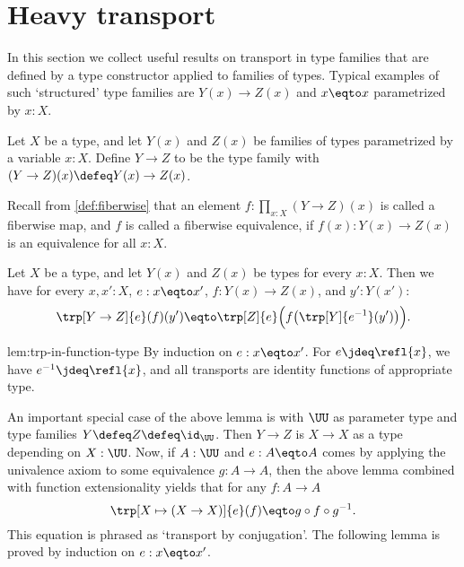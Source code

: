 \section{Heavy transport}
\label{sec:heavy-transport}

In this section we collect useful results on transport in
type families that are defined by a type constructor applied
to families of types.
Typical examples of such `structured' type families are
$Y(x)\to Z(x)$ and $x \eqto x$ parametrized by $x:X$.

\begin{definition}\label{def:function-type-families}
Let $X$ be a type, and let $Y(x)$ and $Z(x)$ be families of types parametrized by a variable $x:X$.
Define $Y\to Z$ to be the type family
with $(Y\to Z)(x) \defeq Y(x)\to Z(x)$.
\end{definition}
Recall from \cref{def:fiberwise} that an element $f : \prod_{x:X}(Y\to Z)(x)$
is called a fiberwise map,
and $f$ is called a fiberwise equivalence,
if $f(x): Y(x)\to Z(x)$ is an equivalence for all $x:X$.

\begin{construction}\label{lem:trp-in-function-type}
Let $X$ be a type, and let $Y(x)$ and $Z(x)$ be types for every $x:X$.
Then we have for every $x,x':X$, $e: x \eqto x'$, $f: Y(x)\to Z(x)$, and $y':Y(x')$:
\[
\trp[Y\to Z]{ e} (f)(y') \eqto \trp[Z]{e} \Bigl(f\bigl(\trp[Y]{ e^{-1}}(y')\bigr)\Bigr).
\]
\end{construction}
\begin{implementation}{lem:trp-in-function-type}
By induction on $e: x \eqto x'$. For $e \jdeq \refl{x}$, we have $e^{-1}\jdeq \refl{x}$,
and all transports are identity functions of appropriate type.
\end{implementation}

An important special case of the above lemma is with $\UU$
as parameter type and type families $Y\defeq Z\defeq \id_\UU$.
Then $Y\to Z$ is $X\to X$ as a type depending on $X:\UU$. Now,
if $A:\UU$ and $e: A \eqto A$ comes by applying the univalence axiom to some equivalence
$g:A\to A$, then the above lemma combined with function extensionality
yields that for any $f: A\to A$
\[
\trp[X \mapsto (X\to X)]{e} (f) \eqto g\circ f \circ g^{-1}.
\]
This equation is phrased as `transport by conjugation'.
The following lemma is proved by induction on $e: x \eqto x'$.


